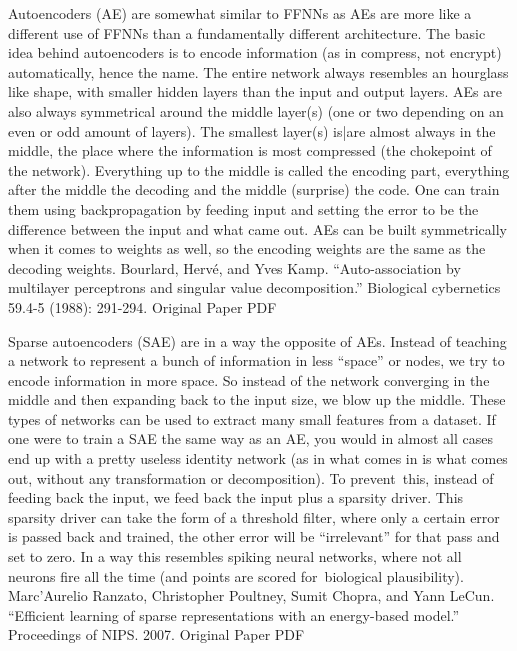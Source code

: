 \documentclass[11pt,a4paper,oneside]{ctexbook}
\begin{document}
Autoencoders (AE) are somewhat similar to FFNNs as AEs are more like a different use of FFNNs than a fundamentally different architecture. The basic idea behind autoencoders is to encode information (as in compress, not encrypt) automatically, hence the name. The entire network always resembles an hourglass like shape, with smaller hidden layers than the input and output layers. AEs are also always symmetrical around the middle layer(s) (one or two depending on an even or odd amount of layers). The smallest layer(s) is|are almost always in the middle, the place where the information is most compressed (the chokepoint of the network). Everything up to the middle is called the encoding part, everything after the middle the decoding and the middle (surprise) the code. One can train them using backpropagation by feeding input and setting the error to be the difference between the input and what came out. AEs can be built symmetrically when it comes to weights as well, so the encoding weights are the same as the decoding weights.
Bourlard, Hervé, and Yves Kamp. “Auto-association by multilayer perceptrons and singular value decomposition.” Biological cybernetics 59.4-5 (1988): 291-294.
Original Paper PDF


Sparse autoencoders (SAE) are in a way the opposite of AEs. Instead of teaching a network to represent a bunch of information in less “space” or nodes, we try to encode information in more space. So instead of the network converging in the middle and then expanding back to the input size, we blow up the middle. These types of networks can be used to extract many small features from a dataset. If one were to train a SAE the same way as an AE, you would in almost all cases end up with a pretty useless identity network (as in what comes in is what comes out, without any transformation or decomposition). To prevent this, instead of feeding back the input, we feed back the input plus a sparsity driver. This sparsity driver can take the form of a threshold filter, where only a certain error is passed back and trained, the other error will be “irrelevant” for that pass and set to zero. In a way this resembles spiking neural networks, where not all neurons fire all the time (and points are scored for biological plausibility).
Marc’Aurelio Ranzato, Christopher Poultney, Sumit Chopra, and Yann LeCun. “Efficient learning of sparse representations with an energy-based model.” Proceedings of NIPS. 2007.
Original Paper PDF
\end{document}

